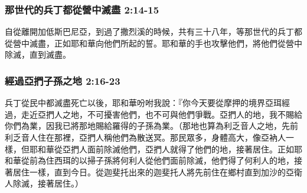 \subsubsection{那世代的兵丁都從營中滅盡 2:14-15}
自從離開加低斯巴尼亞，到過了撒烈溪的時候，共有三十八年，等那世代的兵丁都從營中滅盡，正如耶和華向他們所起的誓。耶和華的手也攻擊他們，將他們從營中除滅，直到滅盡。


\subsubsection{經過亞捫子孫之地 2:16-23}
兵丁從民中都滅盡死亡以後，耶和華吩咐我說：『你今天要從摩押的境界亞珥經過，走近亞捫人之地，不可擾害他們，也不可與他們爭戰。亞捫人的地，我不賜給你們為業，因我已將那地賜給羅得的子孫為業。（那地也算為利乏音人之地，先前利乏音人住在那裡，亞捫人稱他們為散送冥。那民眾多，身體高大，像亞衲人一樣，但耶和華從亞捫人面前除滅他們，亞捫人就得了他們的地，接著居住。正如耶和華從前為住西珥的以掃子孫將何利人從他們面前除滅，他們得了何利人的地，接著居住一樣，直到今日。從迦斐托出來的迦斐托人將先前住在鄉村直到加沙的亞衛人除滅，接著居住。）

